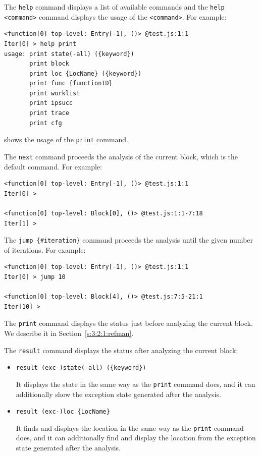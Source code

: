 The \verb!help! command displays a list of available commands and
the \verb!help <command>! command displays the usage of the \verb!<command>!.
For example:
{\small
\begin{verbatim}
<function[0] top-level: Entry[-1], ()> @test.js:1:1
Iter[0] > help print
usage: print state(-all) ({keyword})
       print block
       print loc {LocName} ({keyword})
       print func {functionID}
       print worklist
       print ipsucc
       print trace
       print cfg
\end{verbatim}
}
\noindent
shows the usage of the \verb!print! command.

\medskip
The \verb!next! command proceeds the analysis of the current block,
which is the default command.  For example:
{\small
\begin{verbatim}
<function[0] top-level: Entry[-1], ()> @test.js:1:1
Iter[0] >

<function[0] top-level: Block[0], ()> @test.js:1:1-7:18
Iter[1] >
\end{verbatim}
}

\medskip
The \verb!jump {#iteration}! command proceeds the analysis until the given
number of iterations.  For example:
{\small
\begin{verbatim}
<function[0] top-level: Entry[-1], ()> @test.js:1:1
Iter[0] > jump 10

<function[0] top-level: Block[4], ()> @test.js:7:5-21:1
Iter[10] >
\end{verbatim}
}

\medskip
The \verb!print! command displays the status just before
analyzing the current block.  We describe it in Section~\ref{s:3:2:1:refman}.

\medskip
The \verb!result! command displays the status after analyzing
the current block:
\begin{itemize}
\item \verb!result (exc-)state(-all) ({keyword})!

It displays the state in the same way as the \verb!print! command does,
and it can additionally show the exception state generated after the analysis.
\item \verb!result (exc-)loc {LocName}!

It finds and displays the location in the same way as the \verb!print! command does,
and it can additionally find and display the location from
the exception state generated after the analysis.
\end{itemize}

